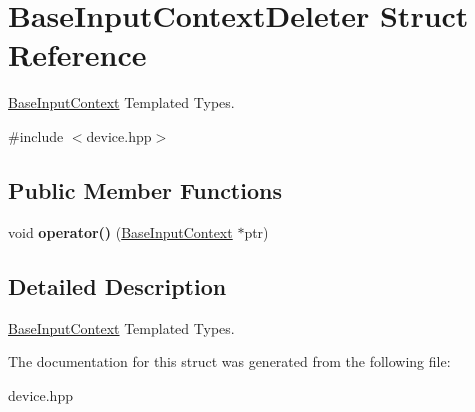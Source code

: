 \hypertarget{structBaseInputContextDeleter}{}\section{Base\+Input\+Context\+Deleter Struct Reference}
\label{structBaseInputContextDeleter}


\hyperlink{classBaseInputContext}{Base\+Input\+Context} Templated Types.  




{\ttfamily \#include $<$device.\+hpp$>$}

\subsection*{Public Member Functions}
\begin{DoxyCompactItemize}
\item 
\mbox{\label{structBaseInputContextDeleter_a4b9dd10f3b0edfc8d8f5691180088118}} 
void {\bfseries operator()} (\hyperlink{classBaseInputContext}{Base\+Input\+Context} $\ast$ptr)
\end{DoxyCompactItemize}


\subsection{Detailed Description}
\hyperlink{classBaseInputContext}{Base\+Input\+Context} Templated Types. 

The documentation for this struct was generated from the following file\+:\begin{DoxyCompactItemize}
\item 
device.\+hpp\end{DoxyCompactItemize}

